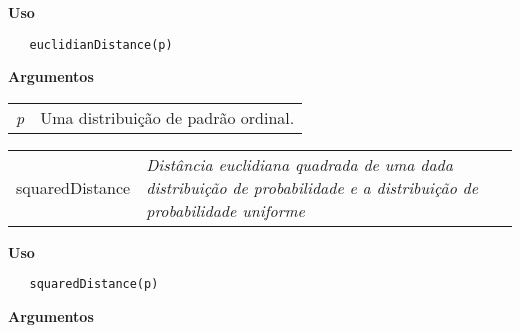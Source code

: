 \vspace{-0.5cm}

\hrulefill  

\vspace{0.5cm}

\textbf{Uso}

\begin{lstlisting}
   euclidianDistance(p)
\end{lstlisting}

\vspace{0.5cm}

\textbf{Argumentos}

\begin{table}[!ht]
\begin{center}
\begin{tabularx}{\textwidth}{X X}
\hspace{0.5cm} \textit{p} & Uma distribuição de padrão ordinal.\\
\end{tabularx}
\end{center}
\end{table} 


\hrulefill   

\begin{table}[!ht]
\begin{center}
\begin{tabularx}{\textwidth}{ X X}
\hspace{0.5cm} squaredDistance & \textit{Distância euclidiana quadrada de uma dada distribuição de probabilidade e a distribuição de probabilidade uniforme}\\
\end{tabularx}
\end{center}
\end{table} 

\vspace{-0.5cm}

\hrulefill  

\vspace{0.5cm}

\textbf{Uso}

\begin{lstlisting}
   squaredDistance(p)
\end{lstlisting}

\vspace{0.5cm}

\textbf{Argumentos}


